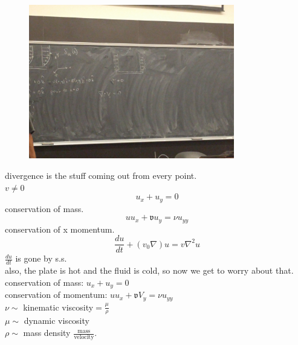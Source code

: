 \documentclass{article}
\begin{document}
\begin{figure}[h!]
    \centering
    \includegraphics[clip=true,trim={45cm 56cm 45cm 30cm},width=0.8\textwidth]{flow2.jpg}
\end{figure}
divergence is the stuff coming out from every point.\\
$v\neq 0$\\
\[u_x+u_y=0\]
conservation of mass.\\

\[uu_x+\mathfrak{v}u_y=\nu u_{yy}\]
conservation of x momentum.\\
\[\frac{du}{dt}+(v_0\nabla) u=v\nabla^2 u\]
$\frac{du}{dt}$ is gone by s.s.\\

also, the plate is hot and the fluid is cold, so now we get to worry about that.\\
conservation of mass: $u_x+u_y=0$\\
conservation of momentum: $uu_x+\mathfrak{v}V_y=\nu u_{yy}$\\
$\nu\sim$ kinematic viscosity$=\frac{\mu}{\rho}$\\
$\mu\sim$ dynamic viscosity\\
$\rho\sim$ mass density $\frac{\text{mass}}{\text{velocity}}$.\\
\end{document}

